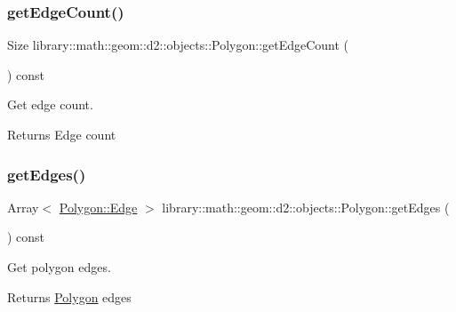 \subsubsection{\texorpdfstring{get\+Edge\+Count()}{getEdgeCount()}}
{\footnotesize\ttfamily Size library\+::math\+::geom\+::d2\+::objects\+::\+Polygon\+::get\+Edge\+Count (\begin{DoxyParamCaption}{ }\end{DoxyParamCaption}) const}



Get edge count. 

\begin{DoxyReturn}{Returns}
Edge count 
\end{DoxyReturn}
\mbox{\label{classlibrary_1_1math_1_1geom_1_1d2_1_1objects_1_1_polygon_a22fbf3d4f9553311497d20b9495841a7}} 
\subsubsection{\texorpdfstring{get\+Edges()}{getEdges()}}
{\footnotesize\ttfamily Array$<$ \hyperlink{classlibrary_1_1math_1_1geom_1_1d2_1_1objects_1_1_polygon_a17e3083d71685e16f3244298e6f44ad9}{Polygon\+::\+Edge} $>$ library\+::math\+::geom\+::d2\+::objects\+::\+Polygon\+::get\+Edges (\begin{DoxyParamCaption}{ }\end{DoxyParamCaption}) const}



Get polygon edges. 

\begin{DoxyReturn}{Returns}
\hyperlink{classlibrary_1_1math_1_1geom_1_1d2_1_1objects_1_1_polygon}{Polygon} edges 
\end{DoxyReturn}
\mbox{\label{classlibrary_1_1math_1_1geom_1_1d2_1_1objects_1_1_polygon_ad6014927b89b109098b60861213ea9ed}} 
